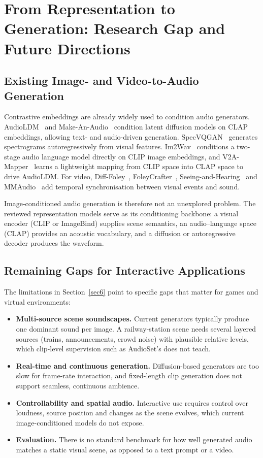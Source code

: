 \documentclass[pdflatex,sn-mathphys-num]{sn-jnl}%
\theoremstyle{thmstyleone}%
\theoremstyle{thmstyletwo}%
\theoremstyle{thmstylethree}%
\begin{document}
\section{From Representation to Generation: Research Gap and Future Directions}\label{sec7}

\subsection{Existing Image- and Video-to-Audio Generation}

Contrastive embeddings are already widely used to condition audio generators. AudioLDM~\cite{liu2023audioldm} and Make-An-Audio~\cite{huang2023makeanaudio} condition latent diffusion models on CLAP embeddings, allowing text- and audio-driven generation. SpecVQGAN~\cite{iashin2021specvqgan} generates spectrograms autoregressively from visual features. Im2Wav~\cite{sheffer2023im2wav} conditions a two-stage audio language model directly on CLIP image embeddings, and V2A-Mapper~\cite{wang2024v2amapper} learns a lightweight mapping from CLIP space into CLAP space to drive AudioLDM. For video, Diff-Foley~\cite{luo2023difffoley}, FoleyCrafter~\cite{zhang2024foleycrafter}, Seeing-and-Hearing~\cite{xing2024seeing} and MMAudio~\cite{cheng2025mmaudio} add temporal synchronisation between visual events and sound.

Image-conditioned audio generation is therefore not an unexplored problem. The reviewed representation models serve as its conditioning backbone: a visual encoder (CLIP or ImageBind) supplies scene semantics, an audio--language space (CLAP) provides an acoustic vocabulary, and a diffusion or autoregressive decoder produces the waveform.

\subsection{Remaining Gaps for Interactive Applications}

The limitations in Section~\ref{sec6} point to specific gaps that matter for games and virtual environments:

\begin{itemize}
\item \textbf{Multi-source scene soundscapes.} Current generators typically produce one dominant sound per image. A railway-station scene needs several layered sources (trains, announcements, crowd noise) with plausible relative levels, which clip-level supervision such as AudioSet's does not teach.
\item \textbf{Real-time and continuous generation.} Diffusion-based generators are too slow for frame-rate interaction, and fixed-length clip generation does not support seamless, continuous ambience.
\item \textbf{Controllability and spatial audio.} Interactive use requires control over loudness, source position and changes as the scene evolves, which current image-conditioned models do not expose.
\item \textbf{Evaluation.} There is no standard benchmark for how well generated audio matches a static visual scene, as opposed to a text prompt or a video.
\end{itemize}
\end{document}
